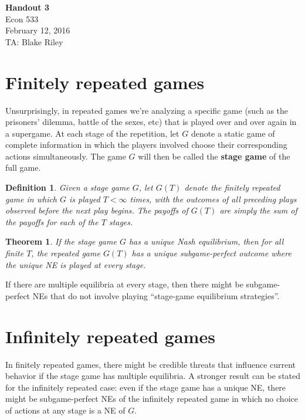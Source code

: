 \documentclass[letter, 10pt]{article}
\theoremstyle{basic}
\newtheorem{definition}{Definition}[section]
\newtheorem{theorem}{Theorem}[section]
\begin{document}
\begin{spacing}{1.0}

\noindent
\textbf{Handout 3} \\
Econ 533 \\
February 12, 2016 \\
TA: Blake Riley \\

\section{Finitely repeated games}

Unsurprisingly, in repeated games we're analyzing a
specific game (such as the prisoners' dilemma, battle of
the sexes, etc) that is played over and over again in a
supergame. At each stage of the repetition, let $G$
denote a static game of complete information in which the
players involved choose their corresponding actions
simultaneously. The game $G$ will then be called the
\textbf{stage game} of the full game.

\begin{definition}
  Given a stage game $G$, let $G(T)$ denote the finitely
  repeated game in which $G$ is played $T<\infty$ times,
  with the outcomes of all preceding plays observed
  before the next play begins. The payoffs of $G(T)$ are
  simply the sum of the payoffs for each of the $T$ stages.
\end{definition}

\begin{theorem}
  If the stage game $G$ has a unique Nash equilibrium,
  then for all finite $T$, the repeated game $G(T)$ has a
  unique subgame-perfect outcome where the unique NE is
  played at every stage.
\end{theorem}

If there are multiple equilibria at every
stage, then there might be subgame-perfect NEs that do
not involve playing ``stage-game equilibrium
strategies''.

\section{Infinitely repeated games}

In finitely repeated games, there might be credible threats that influence
current behavior if the stage game has multiple equilibria. A stronger
result can be stated for the infinitely repeated case: even if the stage
game has a unique NE, there might be subgame-perfect NEs of the infinitely
repeated game in which no choice of actions at any stage is a NE of $G$.


\end{spacing}
\end{document}
